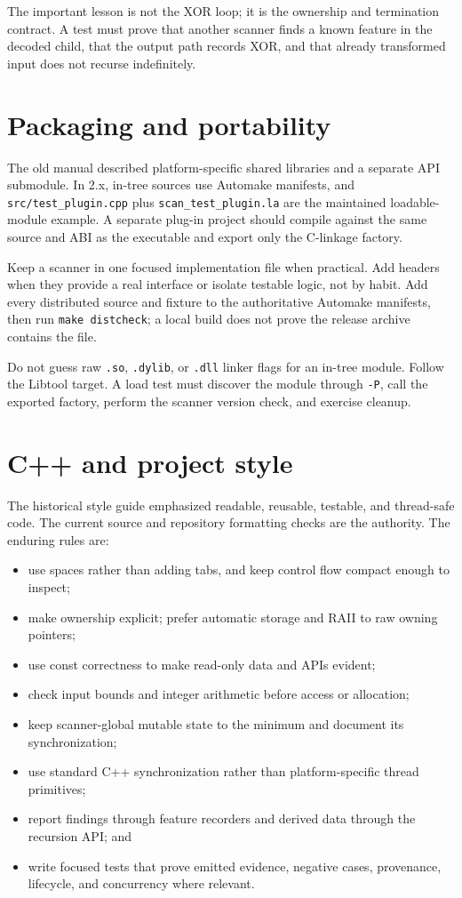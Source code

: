 \documentclass[11pt]{article}
\newcommand{\code}[1]{\texttt{#1}}
\begin{document}
The important lesson is not the XOR loop; it is the ownership and termination
contract. A test must prove that another scanner finds a known feature in the
decoded child, that the output path records XOR, and that already transformed
input does not recurse indefinitely.

\section{Packaging and portability}

The old manual described platform-specific shared libraries and a separate API
submodule. In 2.x, in-tree sources use Automake manifests, and
\code{src/test\_plugin.cpp} plus \code{scan\_test\_plugin.la} are the maintained
loadable-module example. A separate plug-in project should compile against the
same source and ABI as the executable and export only the C-linkage factory.

Keep a scanner in one focused implementation file when practical. Add headers
when they provide a real interface or isolate testable logic, not by habit. Add
every distributed source and fixture to the authoritative Automake manifests,
then run \code{make distcheck}; a local build does not prove the release archive
contains the file.

Do not guess raw \code{.so}, \code{.dylib}, or \code{.dll} linker flags for an
in-tree module. Follow the Libtool target. A load test must discover the module
through \code{-P}, call the exported factory, perform the scanner version check,
and exercise cleanup.

\section{C++ and project style}

The historical style guide emphasized readable, reusable, testable, and
thread-safe code. The current source and repository formatting checks are the
authority. The enduring rules are:

\begin{itemize}
\item use spaces rather than adding tabs, and keep control flow compact enough
  to inspect;
\item make ownership explicit; prefer automatic storage and RAII to raw owning
  pointers;
\item use const correctness to make read-only data and APIs evident;
\item check input bounds and integer arithmetic before access or allocation;
\item keep scanner-global mutable state to the minimum and document its
  synchronization;
\item use standard C++ synchronization rather than platform-specific thread
  primitives;
\item report findings through feature recorders and derived data through the
  recursion API; and
\item write focused tests that prove emitted evidence, negative cases,
  provenance, lifecycle, and concurrency where relevant.
\end{itemize}
\end{document}
